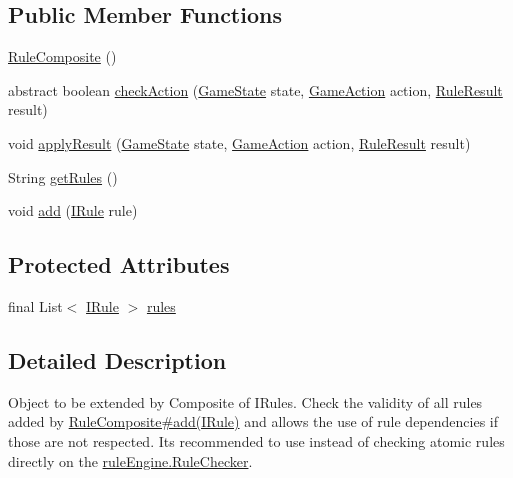 \subsection*{Public Member Functions}
\begin{DoxyCompactItemize}
\item 
\mbox{\hyperlink{classrule_engine_1_1rules_1_1new_rules_1_1_rule_composite_aad1f440c22fc4ba22bd8fb7bcb18ed46}{Rule\+Composite}} ()
\item 
abstract boolean \mbox{\hyperlink{classrule_engine_1_1rules_1_1new_rules_1_1_rule_composite_ab6815980fba07e2757c007ab2a819b8d}{check\+Action}} (\mbox{\hyperlink{classgame_1_1game_state_1_1_game_state}{Game\+State}} state, \mbox{\hyperlink{classrule_engine_1_1_game_action}{Game\+Action}} action, \mbox{\hyperlink{classrule_engine_1_1_rule_result}{Rule\+Result}} result)
\item 
void \mbox{\hyperlink{classrule_engine_1_1rules_1_1new_rules_1_1_rule_composite_a1b548eb3e8f7cf70b736e552f3ae54a2}{apply\+Result}} (\mbox{\hyperlink{classgame_1_1game_state_1_1_game_state}{Game\+State}} state, \mbox{\hyperlink{classrule_engine_1_1_game_action}{Game\+Action}} action, \mbox{\hyperlink{classrule_engine_1_1_rule_result}{Rule\+Result}} result)
\item 
String \mbox{\hyperlink{classrule_engine_1_1rules_1_1new_rules_1_1_rule_composite_a9b41dd74104e0fc2b8bf4f3d13a44f37}{get\+Rules}} ()
\item 
void \mbox{\hyperlink{classrule_engine_1_1rules_1_1new_rules_1_1_rule_composite_a4970c2904b55542c6c7323195a38c845}{add}} (\mbox{\hyperlink{interfacerule_engine_1_1rules_1_1new_rules_1_1_i_rule}{I\+Rule}} rule)
\end{DoxyCompactItemize}
\subsection*{Protected Attributes}
\begin{DoxyCompactItemize}
\item 
final List$<$ \mbox{\hyperlink{interfacerule_engine_1_1rules_1_1new_rules_1_1_i_rule}{I\+Rule}} $>$ \mbox{\hyperlink{classrule_engine_1_1rules_1_1new_rules_1_1_rule_composite_a0f873c0c52e3cf4815d5b09a5ca2ae7f}{rules}}
\end{DoxyCompactItemize}


\subsection{Detailed Description}
Object to be extended by Composite of I\+Rules. Check the validity of all rules added by \mbox{\hyperlink{classrule_engine_1_1rules_1_1new_rules_1_1_rule_composite_a4970c2904b55542c6c7323195a38c845}{Rule\+Composite\#add(\+I\+Rule)}} and allows the use of rule dependencies if those are not respected. It\textquotesingle{}s recommended to use instead of checking atomic rules directly on the \mbox{\hyperlink{classrule_engine_1_1_rule_checker}{rule\+Engine.\+Rule\+Checker}}.

